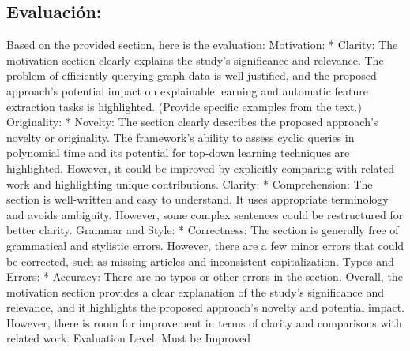 \documentclass{article}%
\begin{document}
%
\subsection{Evaluación:}%
\label{subsec:Evaluacin}%
\newline%
Based on the provided section, here is the evaluation:\newline%
\newline%
Motivation:\newline%
\newline%
* Clarity: The motivation section clearly explains the study's significance and relevance. The problem of efficiently querying graph data is well{-}justified, and the proposed approach's potential impact on explainable learning and automatic feature extraction tasks is highlighted. (Provide specific examples from the text.)\newline%
\newline%
Originality:\newline%
\newline%
* Novelty: The section clearly describes the proposed approach's novelty or originality. The framework's ability to assess cyclic queries in polynomial time and its potential for top{-}down learning techniques are highlighted. However, it could be improved by explicitly comparing with related work and highlighting unique contributions.\newline%
\newline%
Clarity:\newline%
\newline%
* Comprehension: The section is well{-}written and easy to understand. It uses appropriate terminology and avoids ambiguity. However, some complex sentences could be restructured for better clarity.\newline%
\newline%
Grammar and Style:\newline%
\newline%
* Correctness: The section is generally free of grammatical and stylistic errors. However, there are a few minor errors that could be corrected, such as missing articles and inconsistent capitalization.\newline%
\newline%
Typos and Errors:\newline%
\newline%
* Accuracy: There are no typos or other errors in the section.\newline%
\newline%
Overall, the motivation section provides a clear explanation of the study's significance and relevance, and it highlights the proposed approach's novelty and potential impact. However, there is room for improvement in terms of clarity and comparisons with related work.\newline%
\newline%
Evaluation Level: Must be Improved
\end{document}
